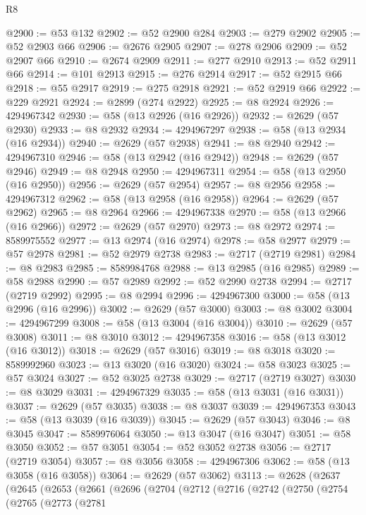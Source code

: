 \begin{lexlean}{R8}
\begin{coremodule}
@2900 := @53 @132
@2902 := @52 @2900 @284
@2903 := @279 @2902
@2905 := @52 @2903 @66
@2906 := @2676 @2905
@2907 := @278 @2906
@2909 := @52 @2907 @66
@2910 := @2674 @2909
@2911 := @277 @2910
@2913 := @52 @2911 @66
@2914 := @101 @2913
@2915 := @276 @2914
@2917 := @52 @2915 @66
@2918 := @55 @2917
@2919 := @275 @2918
@2921 := @52 @2919 @66
@2922 := @229 @2921
@2924 := @2899 (@274 @2922)
@2925 := @8 @2924
@2926 := 4294967342
@2930 := @58 (@13 @2926 (@16 @2926))
@2932 := @2629 (@57 @2930)
@2933 := @8 @2932
@2934 := 4294967297
@2938 := @58 (@13 @2934 (@16 @2934))
@2940 := @2629 (@57 @2938)
@2941 := @8 @2940
@2942 := 4294967310
@2946 := @58 (@13 @2942 (@16 @2942))
@2948 := @2629 (@57 @2946)
@2949 := @8 @2948
@2950 := 4294967311
@2954 := @58 (@13 @2950 (@16 @2950))
@2956 := @2629 (@57 @2954)
@2957 := @8 @2956
@2958 := 4294967312
@2962 := @58 (@13 @2958 (@16 @2958))
@2964 := @2629 (@57 @2962)
@2965 := @8 @2964
@2966 := 4294967338
@2970 := @58 (@13 @2966 (@16 @2966))
@2972 := @2629 (@57 @2970)
@2973 := @8 @2972
@2974 := 8589975552
@2977 := @13 @2974 (@16 @2974)
@2978 := @58 @2977
@2979 := @57 @2978
@2981 := @52 @2979 @2738
@2983 := @2717 (@2719 @2981)
@2984 := @8 @2983
@2985 := 8589984768
@2988 := @13 @2985 (@16 @2985)
@2989 := @58 @2988
@2990 := @57 @2989
@2992 := @52 @2990 @2738
@2994 := @2717 (@2719 @2992)
@2995 := @8 @2994
@2996 := 4294967300
@3000 := @58 (@13 @2996 (@16 @2996))
@3002 := @2629 (@57 @3000)
@3003 := @8 @3002
@3004 := 4294967299
@3008 := @58 (@13 @3004 (@16 @3004))
@3010 := @2629 (@57 @3008)
@3011 := @8 @3010
@3012 := 4294967358
@3016 := @58 (@13 @3012 (@16 @3012))
@3018 := @2629 (@57 @3016)
@3019 := @8 @3018
@3020 := 8589992960
@3023 := @13 @3020 (@16 @3020)
@3024 := @58 @3023
@3025 := @57 @3024
@3027 := @52 @3025 @2738
@3029 := @2717 (@2719 @3027)
@3030 := @8 @3029
@3031 := 4294967329
@3035 := @58 (@13 @3031 (@16 @3031))
@3037 := @2629 (@57 @3035)
@3038 := @8 @3037
@3039 := 4294967353
@3043 := @58 (@13 @3039 (@16 @3039))
@3045 := @2629 (@57 @3043)
@3046 := @8 @3045
@3047 := 8589976064
@3050 := @13 @3047 (@16 @3047)
@3051 := @58 @3050
@3052 := @57 @3051
@3054 := @52 @3052 @2738
@3056 := @2717 (@2719 @3054)
@3057 := @8 @3056
@3058 := 4294967306
@3062 := @58 (@13 @3058 (@16 @3058))
@3064 := @2629 (@57 @3062)
@3113 := @2628
    (@2637
      (@2645
        (@2653
          (@2661
            (@2696
              (@2704
                (@2712
                  (@2716
                    (@2742
                      (@2750
                        (@2754
                          (@2765
                            (@2773
                              (@2781

\end{coremodule}
\end{lexlean}
